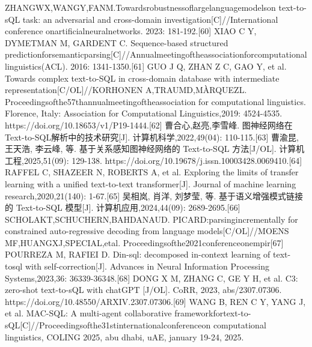 \documentclass[12pt,a4paper,openright,UTF8]{ctexbook}
\begin{document}
ZHANGWX,WANGY,FANM.Towardsrobustnessoflargelanguagemodelson text-to-sQL task: an adversarial and cross-domain investigation[C]//International conference onartificialneuralnetworks. 2023: 181-192.[60] XIAO C Y, DYMETMAN M, GARDENT C. Sequence-based structured predictionforsemanticparsing[C]//Annualmeetingoftheassociationforcomputational linguistics(ACL). 2016: 1341-1350.[61] GUO J Q, ZHAN Z C, GAO Y, et al. Towards complex text-to-SQL in cross-domain database with intermediate representation[C/OL]//KORHONEN A,TRAUMD,MÀRQUEZL. Proceedingsofthe57thannualmeetingoftheassociation for computational linguistics. Florence, Italy: Association for Computational Linguistics,2019: 4524-4535. https://doi.org/10.18653/v1/P19-1444.[62] 曹合心,赵亮,李雪峰. 图神经网络在Text-to-SQL解析中的技术研究[J]. 计算机科学,2022,49(04): 110-115.[63] 曹渝昆, 王天浩, 李云峰, 等. 基于关系感知图神经网络的 Text-to-SQL 方法[J/OL]. 计算机工程,2025,51(09): 129-138. https://doi.org/10.19678/j.issn.10003428.0069410.[64] RAFFEL C, SHAZEER N, ROBERTS A, et al. Exploring the limits of transfer learning with a unified text-to-text transformer[J]. Journal of machine learning research,2020,21(140): 1-67.[65] 吴相岚, 肖洋, 刘梦莹, 等. 基于语义增强模式链接的 Text-to-SQL 模型[J]. 计算机应用,2024,44(09): 2689-2695.[66] SCHOLAKT,SCHUCHERN,BAHDANAUD. PICARD:parsingincrementally for constrained auto-regressive decoding from language models[C/OL]//MOENS MF,HUANGXJ,SPECIAL,etal. Proceedingsofthe2021conferenceonempir[67] POURREZA M, RAFIEI D. Din-sql: decomposed in-context learning of text-tosql with self-correction[J]. Advances in Neural Information Processing Systems,2023,36: 36339-36348.[68] DONG X M, ZHANG C, GE Y H, et al. C3: zero-shot text-to-sQL with chatGPT [J/OL]. CoRR, 2023, abs/2307.07306. https://doi.org/10.48550/ARXIV.2307.07306.[69] WANG B, REN C Y, YANG J, et al. MAC-SQL: A multi-agent collaborative frameworkfortext-to-sQL[C]//Proceedingsofthe31stinternationalconferenceon computational linguistics, COLING 2025, abu dhabi, uAE, january 19-24, 2025.
\end{document}
